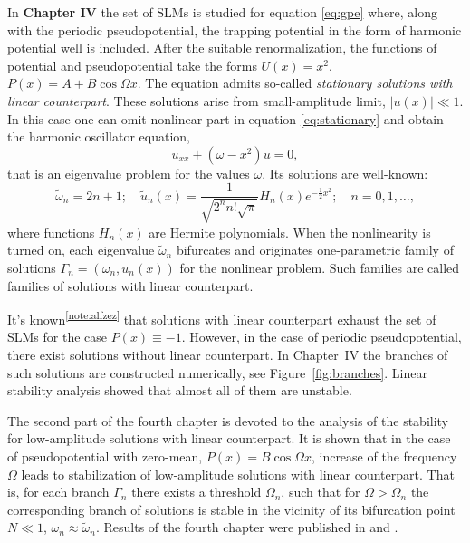 \documentclass[candidate, href, colorlinks]{disser}
\begin{document}
In \textbf{Chapter IV} the set of SLMs is studied for equation \eqref{eq:gpe} where, along with the periodic pseudopotential, the trapping potential in the form of harmonic potential well is included.
After the suitable renormalization, the functions of potential and pseudopotential take the forms $U(x) = x^2$, $P(x) = A + B \cos \Omega x$.
The equation admits so-called {\it stationary solutions with linear counterpart}.
These solutions arise from small-amplitude limit, $|u(x)| \ll 1$.
In this case one can omit nonlinear part in equation \eqref{eq:stationary} and obtain the harmonic oscillator equation,
\begin{equation}
	u_{xx} + (\omega - x^2) u = 0,
\end{equation}
that is an eigenvalue problem for the values $\omega$.
Its solutions are well-known:
\begin{equation}
	\tilde{\omega}_n = 2n + 1; \quad \tilde{u}_n(x) = \dfrac{1}{\sqrt{2^n n! \sqrt{\pi}}} H_n(x) e^{-\frac{1}{2} x^2}; \quad n = 0, 1, \dots,
\label{eq:ho}
\end{equation}
where functions $H_n(x)$ are Hermite polynomials.
When the nonlinearity is turned on, each eigenvalue $\tilde{\omega}_n$ bifurcates and originates one-parametric family of solutions $\Gamma_n = (\omega_n, u_n(x))$ for the nonlinear problem.
Such families are called families of solutions with linear counterpart. 

It's known\textsuperscript{\ref{note:alfzez}} that solutions with linear counterpart exhaust the set of SLMs for the case $P(x) \equiv -1$.
However, in the case of periodic pseudopotential, there exist solutions without linear counterpart.
In Chapter~IV the branches of such solutions are constructed numerically, see Figure~\ref{fig:branches}.
Linear stability analysis showed that almost all of them are unstable.

The second part of the fourth chapter is devoted to the analysis of the stability for low-amplitude solutions with linear counterpart.
It is shown that in the case of pseudopotential with zero-mean, $P(x) = B \cos \Omega x$, increase of the frequency $\Omega$ leads to stabilization of low-amplitude solutions with linear counterpart.
That is, for each branch $\Gamma_n$ there exists a threshold $\Omega_n$, such that for $\Omega > \Omega_n$ the corresponding branch of solutions is stable in the vicinity of its bifurcation point $N \ll 1$, $\omega_n \approx \tilde{\omega}_n$.
Results of the fourth chapter were published in \cite{AlfimovGegelLebedevMalomedZezyulin} and \cite{Bannoe2018}.
\end{document}
